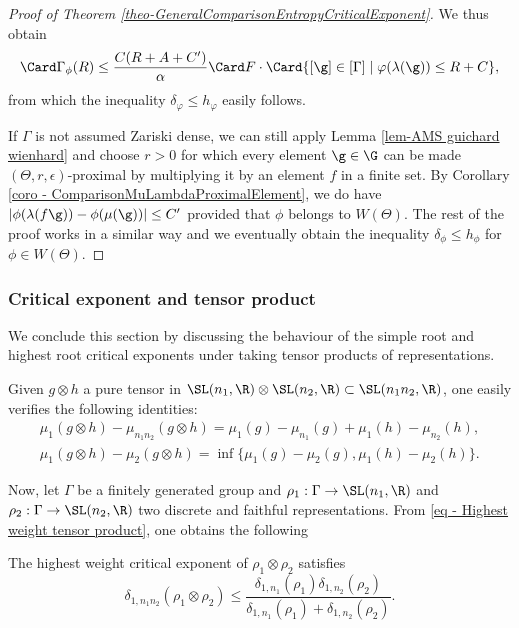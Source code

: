 \begin{proof}[Proof of Theorem \ref{theo-GeneralComparisonEntropyCriticalExponent}]
We thus obtain
\[\Card \Gamma_\phi(R) \leq \frac{C(R+A+C')}{\alpha} \Card F \cdot \Card \{[\g]\in [\Gamma] \mid \varphi(\lambda(\g))\leq R+C\},\]
from which the inequality $\delta_\varphi \leq h_\varphi$ easily follows.

If $\Gamma$ is not assumed Zariski dense, we can still apply Lemma \ref{lem-AMS guichard wienhard} and choose $r>0$ for which every element $\g\in \G$ can be made $(\Theta,r,\epsilon)$-proximal by multiplying it by an element $f$ in a finite set. By Corollary \ref{coro - ComparisonMuLambdaProximalElement}, we do have $|\phi(\lambda(f \g)) - \phi(\mu(\g))| \leq C'$ provided that $\phi$ belongs to $W(\Theta)$. The rest of the proof works in a similar way and we eventually obtain the inequality $\delta_\phi \leq h_\phi$ for $\phi \in W(\Theta)$.
\end{proof}

\subsubsection{Critical exponent and tensor product}

We conclude this section by discussing the behaviour of the simple root and highest root critical exponents under taking tensor products of representations.

Given $g\otimes h$ a pure tensor in $\SL(n_1,\R)\otimes \SL(n_2,\R) \subset \SL(n_1n_2,\R)$, one easily verifies the following identities:
\begin{gather} \label{eq - Highest weight tensor product}
\mu_1(g\otimes h) - \mu_{n_1n_2}(g\otimes h) = \mu_1(g) - \mu_{n_1}(g) + \mu_1(h) - \mu_{n_2}(h),\\
\label{eq - Simple weight tensor product}
\mu_1(g\otimes h) - \mu_{2}(g\otimes h) = \inf \{\mu_1(g) - \mu_2(g), \mu_1(h) - \mu_{2}(h)\}.\end{gather}

Now, let $\Gamma$ be a finitely generated group and $\rho_1: \Gamma \to \SL(n_1,\R)$ and $\rho_2: \Gamma \to \SL(n_2,\R)$ two discrete and faithful representations. From \eqref{eq - Highest weight tensor product}, one obtains the following

\begin{prop} \label{prop - Critical exp HW tensor product}
The highest weight critical exponent of $\rho_1\otimes \rho_2$ satisfies
\[\delta_{1,n_1n_2}(\rho_1\otimes \rho_2)\leq \frac{\delta_{1,n_1}(\rho_1) \delta_{1,n_2}(\rho_2)}{\delta_{1,n_1}(\rho_1) +\delta_{1,n_2}(\rho_2)}.\]
\end{prop}

